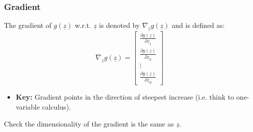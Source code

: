     \subsubsection{Gradient}
    \begin{definition}
        The gradient of \( g(\underline{z}) \) w.r.t. \( \underline{z} \) is denoted by \( \nabla_{\underline{z}} g(\underline{z}) \) and is defined as:
        \begin{equation}
            \nabla_{\underline{z}} g(\underline{z}) = 
            \begin{bmatrix}
                \frac{\partial g(\underline{z})}{\partial \underline{z}_1} \\
                \frac{\partial g(\underline{z})}{\partial \underline{z}_2} \\
                \vdots \\
                \frac{\partial g(\underline{z})}{\partial \underline{z}_d}
            \end{bmatrix}
        \end{equation}

        \begin{itemize}
            \item \textbf{Key:} Gradient points in the direction of steepest increase (i.e. think to one-variable calculus).
        \end{itemize}
    \end{definition}

    \begin{warning}
        Check the dimensionality of the gradient is the same as $\underline{z}$.
    \end{warning}

    \begin{example}
    \end{example}

